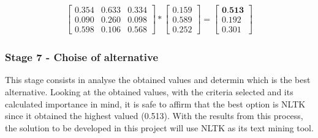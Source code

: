 \begin{gather}
    \begin{bmatrix}
        0.354 & 0.633 & 0.334 \\
        0.090 & 0.260 & 0.098 \\
        0.598 & 0.106 & 0.568
    \end{bmatrix}
    *
    \begin{bmatrix}
      0.159 \\
      0.589 \\
      0.252
    \end{bmatrix}
      =
    \begin{bmatrix}
      \textbf{0.513} \\
      0.192 \\
      0.301
    \end{bmatrix}
\end{gather}

\subsubsection{Stage 7 - Choise of alternative}

This stage consists in analyse the obtained values and determin which is the best alternative.
Looking at the obtained values, with the criteria selected and its calculated importance in mind, it is safe to affirm that the best option is NLTK since it obtained the highest valued (0.513).
With the results from this process, the solution to be developed in this project will use NLTK as its text mining tool.
